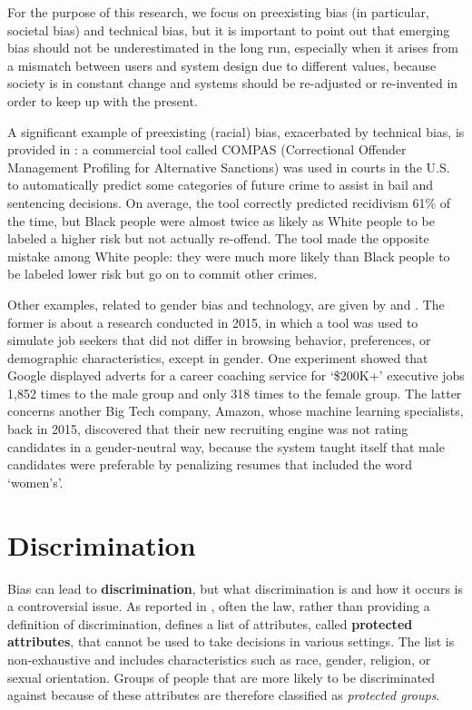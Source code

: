 For the purpose of this research, we focus on preexisting bias (in particular, societal bias) and technical bias, but it is important to point out that emerging bias should not be underestimated in the long run, especially when it arises from a mismatch between users and system design due to different values, because society is in constant change and systems should be re-adjusted or re-invented in order to keep up with the present.

A significant example of preexisting (racial) bias, exacerbated by technical bias, is provided in \cite{angwin2016machine}: a commercial tool called COMPAS (Correctional Offender Management Profiling for Alternative Sanctions) was used in courts in the U.S. to automatically predict some categories of future crime to assist in bail and sentencing decisions. On average, the tool correctly predicted recidivism 61\% of the time, but Black people were almost twice as likely as White people to be labeled a higher risk but not actually re-offend. The tool made the opposite mistake among White people: they were much more likely than Black people to be labeled lower risk but go on to commit other crimes.

Other examples, related to gender bias and technology, are given by \cite{gibbs2015women} and \cite{dastin2018amazon}. The former is about a research conducted in 2015, in which a tool was used to simulate job seekers that did not differ in browsing behavior, preferences, or demographic characteristics, except in gender. One experiment showed that Google displayed adverts for a career coaching service for `\$200K+' executive jobs 1,852 times to the male group and only 318 times to the female group. The latter concerns another Big Tech company, Amazon, whose machine learning specialists, back in 2015, discovered that their new recruiting engine was not rating candidates in a gender-neutral way, because the system taught itself that male candidates were preferable by penalizing resumes that included the word `women's'.


\section{Discrimination}
Bias can lead to \textbf{discrimination}, but what discrimination is and how it occurs is a controversial issue. As reported in \cite{scantamburlo2019machine}, often the law, rather than providing a definition of discrimination, defines a list of attributes, called \textbf{protected attributes}, that cannot be used to take decisions in various settings. The list is non-exhaustive and includes characteristics such as race, gender, religion, or sexual orientation. Groups of people that are more likely to be discriminated against because of these attributes are therefore classified as \textit{protected groups}.

